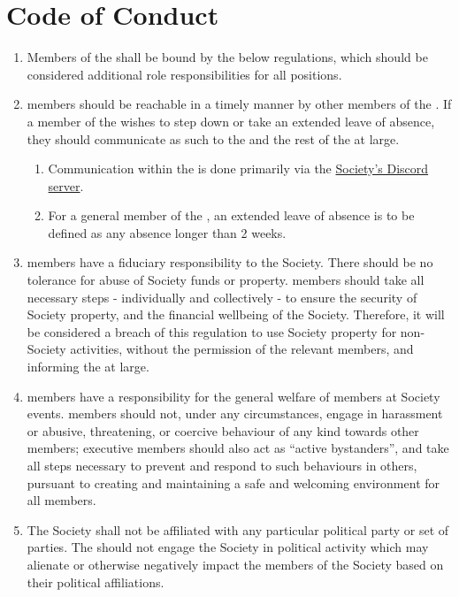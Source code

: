 \documentclass[a4paper,11pt,parskip=half-]{scrartcl} %
\begin{document}
\section{Code of Conduct}\label{sec:coc}
    \begin{enumerate}
        \item\label{bound-coc} Members of the \exec shall be bound by the below regulations, which should be considered additional role responsibilities for all \exec positions.

        \item \exec members should be reachable in a timely manner by other members of the \exec. If a member of the \exec wishes to step down or take an extended leave of absence, they should communicate as such to the  and the rest of the \exec at large.
            \begin{enumerate}
                \item Communication within the \exec is done primarily via the \href{https://discord.uwcs.uk}{Society's Discord server}.
                \item For a general member of the \exec, an extended leave of absence is to be defined as any absence longer than 2 weeks.
            \end{enumerate}

        \item \exec members have a fiduciary responsibility to the Society. There should be no tolerance for abuse of Society funds or property. \exec members should take all necessary steps - individually and collectively - to ensure the security of Society property, and the financial wellbeing of the Society. Therefore, it will be considered a breach of this regulation to use Society property for non-Society activities, without the permission of the relevant \exec members, and informing the \exec at large.

        \item \exec members have a responsibility for the general welfare of members at Society events. \exec members should not, under any circumstances, engage in harassment or abusive, threatening, or coercive behaviour of any kind towards other members; executive members should also act as ``active bystanders'', and take all steps necessary to prevent and respond to such behaviours in others, pursuant to creating and maintaining a safe and welcoming environment for all members.

        \item The Society shall not be affiliated with any particular political party or set of parties. The \exec should not engage the Society in political activity which may alienate or otherwise negatively impact the members of the Society based on their political affiliations.


\end{enumerate}
\end{document}
